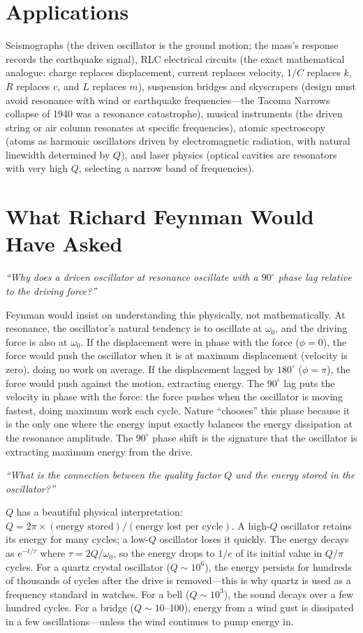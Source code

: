 \documentclass[11pt,openright]{book}
\begin{document}
\section*{Applications}

Seismographs (the driven oscillator is the ground motion; the mass's response records the earthquake signal), RLC electrical circuits (the exact mathematical analogue: charge replaces displacement, current replaces velocity, $1/C$ replaces $k$, $R$ replaces $c$, and $L$ replaces $m$), suspension bridges and skyscrapers (design must avoid resonance with wind or earthquake frequencies---the Tacoma Narrows collapse of 1940 was a resonance catastrophe), musical instruments (the driven string or air column resonates at specific frequencies), atomic spectroscopy (atoms as harmonic oscillators driven by electromagnetic radiation, with natural linewidth determined by $Q$), and laser physics (optical cavities are resonators with very high $Q$, selecting a narrow band of frequencies).
\section*{What Richard Feynman Would Have Asked}

\textit{``Why does a driven oscillator at resonance oscillate with a $90^\circ$ phase lag relative to the driving force?''}

Feynman would insist on understanding this physically, not mathematically. At resonance, the oscillator's natural tendency is to oscillate at $\omega_0$, and the driving force is also at $\omega_0$. If the displacement were in phase with the force ($\phi = 0$), the force would push the oscillator when it is at maximum displacement (velocity is zero), doing no work on average. If the displacement lagged by $180^\circ$ ($\phi = \pi$), the force would push against the motion, extracting energy. The $90^\circ$ lag puts the velocity in phase with the force: the force pushes when the oscillator is moving fastest, doing maximum work each cycle. Nature ``chooses'' this phase because it is the only one where the energy input exactly balances the energy dissipation at the resonance amplitude. The $90^\circ$ phase shift is the signature that the oscillator is extracting maximum energy from the drive.

\textit{``What is the connection between the quality factor $Q$ and the energy stored in the oscillator?''}

$Q$ has a beautiful physical interpretation: $Q = 2\pi \times (\text{energy stored})/(\text{energy lost per cycle})$. A high-$Q$ oscillator retains its energy for many cycles; a low-$Q$ oscillator loses it quickly. The energy decays as $e^{-t/\tau}$ where $\tau = 2Q/\omega_0$, so the energy drops to $1/e$ of its initial value in $Q/\pi$ cycles. For a quartz crystal oscillator ($Q \sim 10^6$), the energy persists for hundreds of thousands of cycles after the drive is removed---this is why quartz is used as a frequency standard in watches. For a bell ($Q \sim 10^3$), the sound decays over a few hundred cycles. For a bridge ($Q \sim 10$--$100$), energy from a wind gust is dissipated in a few oscillations---unless the wind continues to pump energy in.
\end{document}
